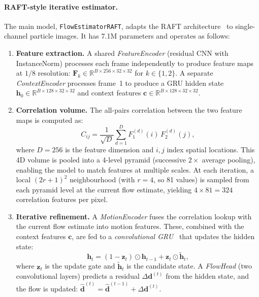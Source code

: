 \documentclass[11pt, a4paper]{article}
\newcommand{\R}{\mathbb{R}}
\newcommand{\vect}[1]{\bm{#1}}
\begin{document}
\paragraph{RAFT-style iterative estimator.}
The main model, \texttt{FlowEstimatorRAFT}, adapts the RAFT architecture~\cite{teed2020raft} to single-channel particle images.
It has 7.1M parameters and operates as follows:

\begin{enumerate}
    \item \textbf{Feature extraction.}
    A shared \emph{FeatureEncoder} (residual CNN with InstanceNorm) processes each frame independently to produce feature maps at $1/8$ resolution: $\vect{F}_k \in \R^{B \times 256 \times 32 \times 32}$ for $k \in \{1, 2\}$.
    A separate \emph{ContextEncoder} processes frame~1 to produce a GRU hidden state $\vect{h}_0 \in \R^{B \times 128 \times 32 \times 32}$ and context features $\vect{c} \in \R^{B \times 128 \times 32 \times 32}$.

    \item \textbf{Correlation volume.}
    The all-pairs correlation between the two feature maps is computed as:
    \begin{equation}
        C_{ij} = \frac{1}{\sqrt{D}} \sum_{d=1}^{D} F_{1}^{(d)}(i)\, F_{2}^{(d)}(j),
        \label{eq:corr}
    \end{equation}
    where $D = 256$ is the feature dimension and $i, j$ index spatial locations.
    This 4D volume is pooled into a 4-level pyramid (successive $2\times$ average pooling), enabling the model to match features at multiple scales.
    At each iteration, a local $(2r+1)^2$ neighbourhood (with $r=4$, so 81 values) is sampled from each pyramid level at the current flow estimate, yielding $4 \times 81 = 324$ correlation features per pixel.

    \item \textbf{Iterative refinement.}
    A \emph{MotionEncoder} fuses the correlation lookup with the current flow estimate into motion features.
    These, combined with the context features $\vect{c}$, are fed to a \emph{convolutional GRU}~\cite{cho2014gru} that updates the hidden state:
    \begin{equation}
        \vect{h}_{t} = (1 - \vect{z}_t) \odot \vect{h}_{t-1} + \vect{z}_t \odot \tilde{\vect{h}}_t,
        \label{eq:gru}
    \end{equation}
    where $\vect{z}_t$ is the update gate and $\tilde{\vect{h}}_t$ is the candidate state.
    A \emph{FlowHead} (two convolutional layers) predicts a residual $\Delta\vect{d}^{(t)}$ from the hidden state, and the flow is updated: $\hat{\vect{d}}^{(t)} = \hat{\vect{d}}^{(t-1)} + \Delta\vect{d}^{(t)}$.


\end{enumerate}
\end{document}
